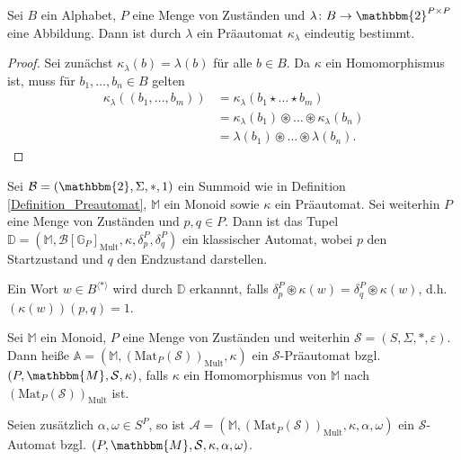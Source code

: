 \documentclass{article}
\begin{document}
\begin{theorem}
  Sei $B$ ein Alphabet, $P$ eine Menge von Zuständen
  und $\lambda \colon B \to \mathbbm{2}^{P \times P}$ eine Abbildung.
  Dann ist durch $\lambda$ ein Präautomat $\kappa_\lambda$ eindeutig bestimmt.
\end{theorem}
\begin{proof}
  Sei zunächst $\kappa_\lambda(b) = \lambda(b)$ für alle $b \in B$.
  Da $\kappa$ ein Homomorphismus ist, muss für $b_1, \dots, b_n \in B$ gelten
  \begin{align*}
    \kappa_\lambda((b_1, \dots, b_m))
    &= \kappa_\lambda(b_1 \star \dots \star b_m) \\
    &= \kappa_\lambda(b_1) \circledast \dots \circledast \kappa_\lambda(b_n) \\
    &= \lambda(b_1) \circledast \dots \circledast \lambda(b_n).
  \end{align*}
\end{proof}

\begin{definition}
  Sei $\mathcal{B} = (\mathbbm{2}, \Sigma, \ast, 1)$ ein Summoid wie in Definition \ref{Definition_Preautomat},
  $\mathbb{M}$ ein Monoid
  sowie $\kappa$ ein Präautomat.
  Sei weiterhin $P$ eine Menge von Zuständen
  und $p, q \in P$.
  Dann ist das Tupel $\mathbb{D} = (\mathbb{M}, \mathcal{B}[\mathbb{G}_P]_\text{Mult}, \kappa, \delta^P_p, \delta^P_q)$
  ein klassischer Automat,
  wobei $p$ den Startzustand und $q$ den Endzustand darstellen.

  Ein Wort $w \in B^{\langle \ast \rangle}$ wird durch $\mathbb{D}$ erkannnt,
  falls $\delta^P_p \circledast \kappa(w) = \delta^P_q \circledast \kappa(w)$,
  d.h. $(\kappa(w))(p, q) = 1$.
\end{definition}

\begin{definition}
  Sei $\mathbb{M}$ ein Monoid,
  $P$ eine Menge von Zuständen
  und weiterhin $\mathcal{S} = (S, \Sigma, \ast, \varepsilon)$.
  Dann heiße $\mathbb{A} = (\mathbb{M}, (\text{Mat}_P(\mathcal{S}))_\text{Mult}, \kappa)$
  ein $\mathcal{S}$-Präautomat bzgl. $(P, \mathbbm{M}, \mathcal{S}, \kappa)$,
  falls $\kappa$ ein Homomorphismus von $\mathbb{M}$ nach $(\text{Mat}_P(\mathcal{S}))_\text{Mult}$
  ist.

  Seien zusätzlich $\alpha, \omega \in S^P$,
  so ist $\mathcal{A} = (\mathbb{M}, (\text{Mat}_P(\mathcal{S}))_\text{Mult}, \kappa, \alpha, \omega)$
  ein $\mathcal{S}$-Automat bzgl. $(P, \mathbbm{M}, \mathcal{S}, \kappa, \alpha, \omega)$.
\end{definition}
\end{document}

